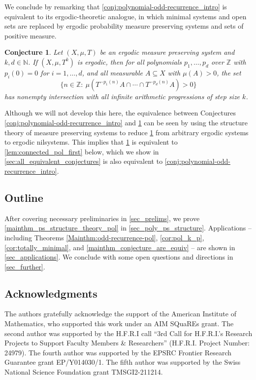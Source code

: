 \documentclass{article}
\theoremstyle{plain}
\newtheorem{Conjecture}[Theorem]{Conjecture}
\theoremstyle{claim}
\theoremstyle{definition}
\theoremstyle{plain}
\theoremstyle{plain}
\newcommand{\N}{\mathbb{N}}
\newcommand{\Z}{\mathbb{Z}}
\newcommand{\1}{\boldsymbol{1}}
\begin{document}
We conclude by remarking that \cref{conj:polynomial-odd-recurrence_intro} is equivalent to its ergodic-theoretic analogue, in which minimal systems and open sets are replaced by ergodic probability measure preserving systems and sets of positive measure.

\begin{Conjecture}
\label{conj_meas_analogue_of_poly_odd_rec}
    Let $(X,\mu,T)$ be an ergodic measure preserving system and $k, d \in \N$. If $(X,\mu,T^k)$ is ergodic, then for all polynomials $p_1,\dots,p_d$ over $\Z$ with $p_i(0)=0$ for $i = 1, \ldots, d$, and all measurable $A \subseteq X$ with $\mu(A) > 0$, the set
    \[\big\{ n \in \Z : \ \mu(T^{-p_1(n)}A\cap\cdots\cap T^{-p_d(n)}A) > 0 \big\}\]
    has nonempty intersection with all infinite arithmetic progressions of step size $k$.
\end{Conjecture}

Although we will not develop this here, the equivalence between Conjectures \ref{conj:polynomial-odd-recurrence_intro} and \ref{conj_meas_analogue_of_poly_odd_rec} can be seen by using the structure theory of measure preserving systems to reduce \cref{conj_meas_analogue_of_poly_odd_rec} from arbitrary ergodic systems to ergodic nilsystems. 
This implies that \cref{conj_meas_analogue_of_poly_odd_rec} is equivalent to \cref{lem:connected_pol_first} below, which we show in \cref{sec:all_equivalent_conjectures} is also equivalent to \cref{conj:polynomial-odd-recurrence_intro}.

\subsection{Outline}

After covering necessary preliminaries in \cref{sec_prelims}, we prove \cref{mainthm_ps_structure_theory_pol} in \cref{sec_poly_ps_structure}.  Applications -- including Theorems \ref{Mainthm:odd-recurrence-pol}, \ref{cor:pol_k_p}, \ref{cor:totally_minimal}, and \ref{mainthm_conjecture_are_equiv} -- are shown in \cref{sec_applications}.  We conclude with some open questions and directions in \cref{sec_further}.

\subsection{Acknowledgments}
The authors gratefully acknowledge the support of the American Institute of Mathematics, who supported this work under an AIM SQuaREs grant.
The second author was supported by the H.F.R.I call ``3rd Call for H.F.R.I.’s Research Projects to Support Faculty Members \& Researchers'' (H.F.R.I. Project Number: 24979).
The fourth author was supported by the EPSRC Frontier Research Guarantee grant EP/Y014030/1.
The fifth author was supported by the Swiss National Science Foundation grant TMSGI2-211214.
\end{document}

